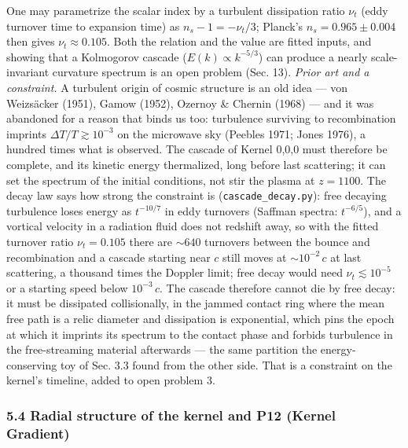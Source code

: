 \documentclass[
  11pt,
]{article}
\begin{document}
One may parametrize the scalar index by a turbulent dissipation ratio
\(\nu_t\) (eddy turnover time to expansion time) as
\(n_s - 1 = -\nu_t/3\); Planck's \(n_s = 0.965 \pm 0.004\) then gives
\(\nu_t \approx 0.105\). Both the relation and the value are fitted
inputs, and showing that a Kolmogorov cascade
(\(E(k) \propto k^{-5/3}\)) can produce a nearly scale-invariant
curvature spectrum is an open problem (Sec. 13). \emph{Prior art and a
constraint.} A turbulent origin of cosmic structure is an old idea ---
von Weizsäcker (1951), Gamow (1952), Ozernoy \& Chernin (1968) --- and
it was abandoned for a reason that binds us too: turbulence surviving to
recombination imprints \(\Delta T/T \gtrsim 10^{-3}\) on the microwave
sky (Peebles 1971; Jones 1976), a hundred times what is observed. The
cascade of Kernel 0,0,0 must therefore be complete, and its kinetic
energy thermalized, long before last scattering; it can set the spectrum
of the initial conditions, not stir the plasma at \(z = 1100\). The
decay law says how strong the constraint is
(\texttt{cascade\_decay.py}): free decaying turbulence loses energy as
\(t^{-10/7}\) in eddy turnovers (Saffman spectra: \(t^{-6/5}\)), and a
vortical velocity in a radiation fluid does not redshift away, so with
the fitted turnover ratio \(\nu_t = 0.105\) there are \(\sim 640\)
turnovers between the bounce and recombination and a cascade starting
near \(c\) still moves at \(\sim 10^{-2}\,c\) at last scattering, a
thousand times the Doppler limit; free decay would need
\(\nu_t \lesssim 10^{-5}\) or a starting speed below \(10^{-3}\,c\). The
cascade therefore cannot die by free decay: it must be dissipated
collisionally, in the jammed contact ring where the mean free path is a
relic diameter and dissipation is exponential, which pins the epoch at
which it imprints its spectrum to the contact phase and forbids
turbulence in the free-streaming material afterwards --- the same
partition the energy-conserving toy of Sec. 3.3 found from the other
side. That is a constraint on the kernel's timeline, added to open
problem 3.

\hypertarget{radial-structure-of-the-kernel-and-p12-kernel-gradient}{%
\subsubsection{\texorpdfstring{\textbf{5.4 Radial structure of the
kernel and P12 (Kernel
Gradient)}}{5.4 Radial structure of the kernel and P12 (Kernel Gradient)}}\label{radial-structure-of-the-kernel-and-p12-kernel-gradient}}
\end{document}
